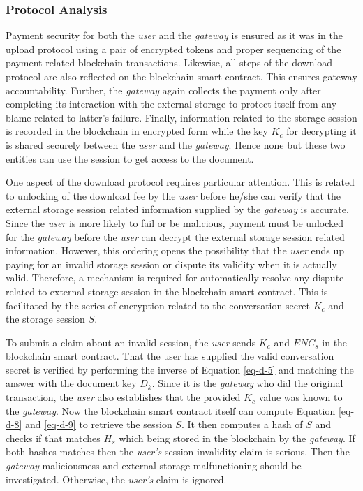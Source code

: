 \subsubsection*{Protocol Analysis}
Payment security for both the {\it user} and the {\it gateway} is ensured as it was in the upload protocol using a pair of encrypted tokens and proper sequencing of the payment related blockchain transactions. Likewise, all steps of the download protocol are also reflected on the blockchain smart contract. This ensures gateway accountability. Further, the {\it gateway} again collects the payment only after completing its interaction with the external storage to protect itself from any blame related to latter's failure. Finally, information related to the storage session  is recorded in the blockchain in encrypted form while the key $K_c$ for decrypting it is shared securely between the {\it user} and the {\it gateway}. Hence none but these two entities can use the session to get access to the document.

One aspect of the download protocol requires particular attention. This is related to unlocking of the download fee by the {\it user} before he/she can verify that the external storage session related information supplied by the {\it gateway} is accurate. Since the {\it user} is more likely to fail or be malicious, payment must be unlocked for the {\it gateway} before the {\it user} can decrypt the external storage session related information. However, this ordering opens the possibility that the {\it user} ends up paying for an invalid storage session or dispute its validity when it is actually valid. Therefore, a mechanism is required for automatically resolve any dispute related to external storage session in the blockchain smart contract. This is facilitated by the series of encryption related to the conversation secret $K_c$ and the storage session $S$.

To submit a claim about an invalid session, the {\it user} sends $K_c$ and $ENC_s$ in the blockchain smart contract. That the user has supplied the valid conversation secret is verified by performing the inverse of Equation \ref{eq-d-5} and matching the answer with the document key $D_k$. Since it is the {\it gateway} who did the original transaction, the {\it user} also establishes that the provided $K_c$ value was known to the {\it gateway}. Now the blockchain smart contract itself can compute Equation \ref{eq-d-8} and \ref{eq-d-9} to retrieve the session $S$. It then computes a hash of $S$ and checks if that matches $H_s$ which being stored in the blockchain by the {\it gateway}. If both hashes matches then the {\it user's} session invalidity claim is serious. Then the {\it gateway} maliciousness and external storage  malfunctioning should be investigated. Otherwise, the {\it user's} claim is ignored.          

